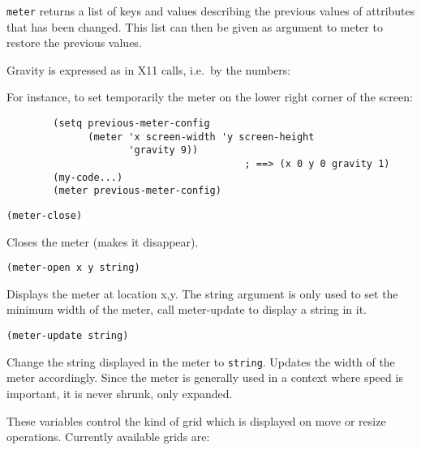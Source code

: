 \verb"meter" returns a list of keys and values describing the previous values
of attributes that has been changed. This list can then be given as
argument to meter to restore the previous values.

Gravity is expressed as in X11 calls, i.e.\ by the numbers:
\centerline{}
For instance, to set temporarily the meter on the lower right corner
of the screen:

{\exemplefont\begin{verbatim}
        (setq previous-meter-config
              (meter 'x screen-width 'y screen-height
                     'gravity 9))
                                         ; ==> (x 0 y 0 gravity 1)
        (my-code...)
        (meter previous-meter-config)
\end{verbatim}}

        
{\usagefont\begin{verbatim}
(meter-close)
\end{verbatim}}\usageupspace

Closes the meter (makes it disappear).

        
{\usagefont\begin{verbatim}
(meter-open x y string)
\end{verbatim}}\usageupspace

Displays the meter at location x,y. The string argument is only used to set
the minimum width of the meter, call meter-update to display a string in it.

        
{\usagefont\begin{verbatim}
(meter-update string)
\end{verbatim}}\usageupspace

Change the string displayed in the meter to \verb"string". Updates the width
of the meter accordingly. Since the meter is generally used in a context
where speed is important, it is never shrunk, only expanded.

        

These variables control the kind of grid which is displayed on move or
resize operations. Currently available grids are:

